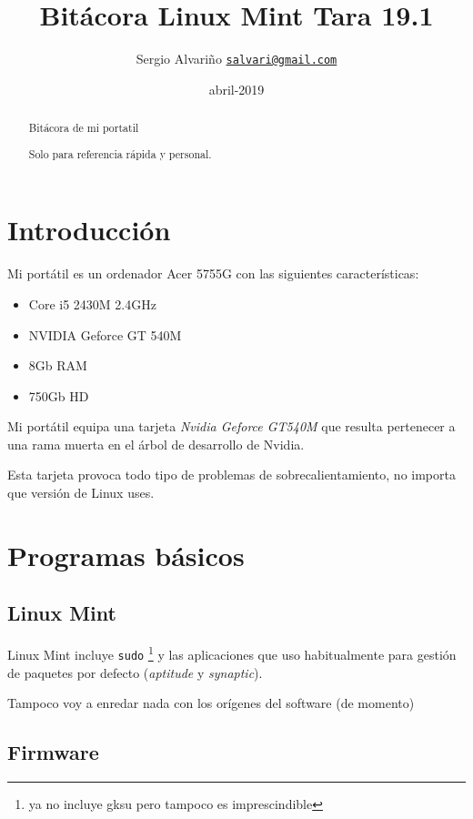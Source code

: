 \documentclass[
  12pt,
  spanish,
]{article}
\title{Bitácora Linux Mint Tara 19.1}
\author{Sergio Alvariño
\href{mailto:salvari@gmail.com}{\nolinkurl{salvari@gmail.com}}}
\date{abril-2019}
\begin{document}
\maketitle
\begin{abstract}
Bitácora de mi portatil

Solo para referencia rápida y personal.
\end{abstract}

{
\hypersetup{linkcolor=}
\setcounter{tocdepth}{3}
\tableofcontents
}
\hypertarget{introducciuxf3n}{%
\section{Introducción}\label{introducciuxf3n}}

Mi portátil es un ordenador Acer 5755G con las siguientes
características:

\begin{itemize}
\item
  Core i5 2430M 2.4GHz
\item
  NVIDIA Geforce GT 540M
\item
  8Gb RAM
\item
  750Gb HD
\end{itemize}

Mi portátil equipa una tarjeta \emph{Nvidia Geforce GT540M} que resulta
pertenecer a una rama muerta en el árbol de desarrollo de Nvidia.

Esta tarjeta provoca todo tipo de problemas de sobrecalientamiento, no
importa que versión de Linux uses.

\hypertarget{programas-buxe1sicos}{%
\section{Programas básicos}\label{programas-buxe1sicos}}

\hypertarget{linux-mint}{%
\subsection{Linux Mint}\label{linux-mint}}

Linux Mint incluye \texttt{sudo} \footnote{ya no incluye gksu pero
  tampoco es imprescindible} y las aplicaciones que uso habitualmente
para gestión de paquetes por defecto (\emph{aptitude} y
\emph{synaptic}).

Tampoco voy a enredar nada con los orígenes del software (de momento)

\hypertarget{firmware}{%
\subsection{Firmware}\label{firmware}}
\end{document}
